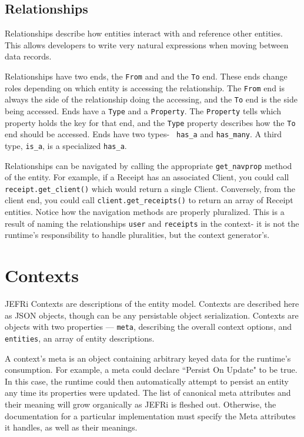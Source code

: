 \documentclass{article}
\newcommand{\ilcode}{\tt}
\begin{document}
\subsection{Relationships}

Relationships describe how entities interact with and reference
other entities. This allows developers to write very natural expressions when
moving between data records.

Relationships have two ends, the {\ilcode From} and and the {\ilcode To} end.
These ends change roles depending on which entity is accessing the relationship.
The {\ilcode From} end is always the side of the relationship doing the
accessing, and the {\ilcode To} end is the side being accessed. Ends have a
{\ilcode Type} and a {\ilcode Property}. The {\ilcode Property} tells which
property holds the key for that end, and the {\ilcode Type} property describes
how the {\ilcode To} end should be accessed. Ends have two types- {\ilcode
has\_a} and {\ilcode has\_many}. A third type, {\ilcode is\_a}, is a specialized
{\ilcode has\_a}.

Relationships can be navigated by calling the appropriate {\ilcode get\_navprop}
method of the entity. For example, if a Receipt has an associated Client, you
could call {\ilcode receipt.get\_client()} which would return a single Client.
Conversely, from the client end, you could call {\ilcode client.get\_receipts()}
to return an array of Receipt entities. Notice how the navigation methods are
properly pluralized. This is a result of naming the relationships {\ilcode user}
and {\ilcode receipts} in the context- it is not the runtime's responsibility to
handle pluralities, but the context generator's.

\section{Contexts}

JEFRi Contexts are descriptions of the entity model. Contexts are described here
as JSON objects, though can be any persistable object serialization. Contexts
are objects with two properties --- {\ilcode meta}, describing the overall
context options, and {\tt entities}, an array of entity descriptions.

A context's meta is an object containing arbitrary keyed data for the runtime's
consumption. For example, a meta could declare ``Persist On Update" to be true.
In this case, the runtime could then automatically attempt to persist an entity
any time its properties were updated. The list of canonical meta attributes and
their meaning will grow organically as JEFRi is fleshed out. Otherwise, the
documentation for a particular implementation must specify the Meta attributes
it handles, as well as their meanings.
\end{document}
